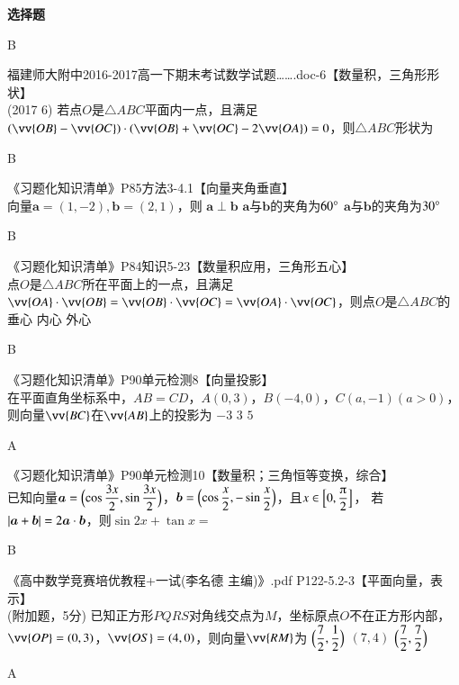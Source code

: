 \begin{exercise}{\bf 选择题}
\begin{answer}
        B
      \end{answer}
    \item 福建师大附中2016-2017高一下期末考试数学试题…….doc-6【数量积，三角形形状】\\
      (2017  6)
      若点$O$是$\triangle{ABC}$平面内一点，且满足$(\vv{OB}-\vv{OC})\cdot(\vv{OB}+\vv{OC}-2\vv{OA})=0$，则$\triangle{ABC}$形状为\xz
      \begin{answer}
        B
      \end{answer}
    \item 《习题化知识清单》P85方法3-4.1【向量夹角垂直】\\
      向量$\bm a=(1,-2),\bm b=(2,1)$，则\xz
        {$\bm a\perp \bm b$}
        {$\bm a$与$\bm b$的夹角为$60\degree$}
        {$\bm a$与$\bm b$的夹角为$30\degree$}
      \begin{answer}
        B
      \end{answer}
    \item 《习题化知识清单》P84知识5-23【数量积应用，三角形五心】\\
      点$O$是$\triangle{ABC}$所在平面上的一点，且满足$\vv{OA}\cdot\vv{OB}=\vv{OB}\cdot\vv{OC}=\vv{OA}\cdot\vv{OC}$，则点$O$是$\triangle{ABC}$的\xz
          {垂心}
          {内心}
          {外心}
      \begin{answer}
        B
      \end{answer}
    \item 《习题化知识清单》P90单元检测8【向量投影】\\
      在平面直角坐标系中，$AB=CD$，$A(0,3)$，$B(-4,0)$，$C(a,-1)(a>0)$，则向量$\vv{BC}$在$\vv{AB}$上的投影为\xz
          {$-3$}
          {$3$}
          {$5$}
      \begin{answer}
        A
      \end{answer}
    \item 《习题化知识清单》P90单元检测10【数量积；三角恒等变换，综合】\\
      已知向量$\bm a=\Bigl(\cos\dfrac{3x}2,\sin\dfrac{3x}2\Bigr)$，$\bm b=\Bigl(\cos\dfrac{x}2,-\sin\dfrac{x}2\Bigr)$，且$x\in\Bigl[0,\dfrac{\piup}2\Bigr]$，
      若$\left| \bm a+\bm b \right|=2\bm a\cdot\bm b$，则$\sin{2x}+\tan{x}=$\xz
      \begin{answer}
        B
      \end{answer}
    \item 《高中数学竞赛培优教程+一试(李名德 主编)》.pdf P122-5.2-3【平面向量，表示】\\
      (附加题，5分)
      已知正方形$PQRS$对角线交点为$M$，坐标原点$O$不在正方形内部，$\vv{OP}=(0,3)$，$\vv{OS}=(4,0)$，则向量$\vv{RM}$为\xz
        {$\Bigl(\dfrac{7}{2},\dfrac{1}{2}\Bigr)$}
        {$(7,4)$}
        {$\Bigl(\dfrac{7}{2},\dfrac{7}{2}\Bigr)$}
      \begin{answer}
        A
      \end{answer}
  \end{exercise}
